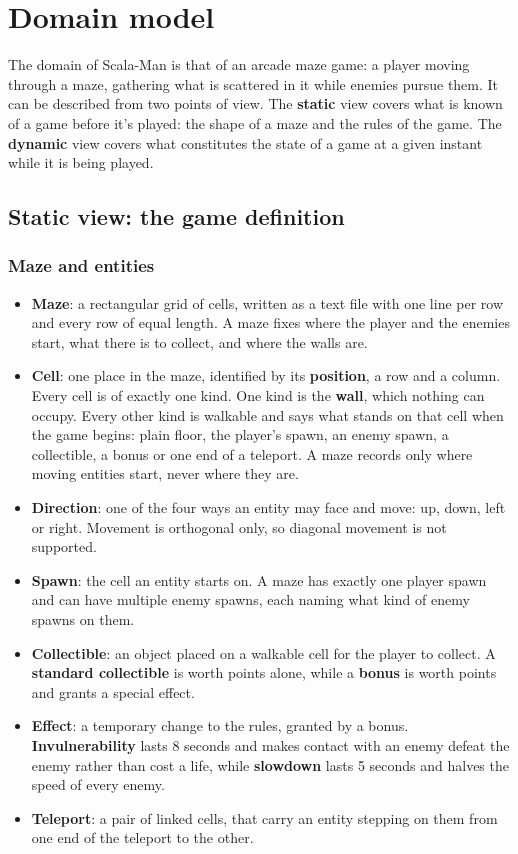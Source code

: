 \section{Domain model}

The domain of Scala-Man is that of an arcade maze game: a player moving through a maze, gathering what is scattered in
it while enemies pursue them. It can be described from two points of view.
The \textbf{static} view covers what is known of a game before it's played: the shape of a maze and the rules of the
game. The \textbf{dynamic} view covers what constitutes the state of a game at a given instant while it is being played.

\subsection{Static view: the game definition}

\subsubsection{Maze and entities}

\begin{itemize}
  \item \textbf{Maze}: a rectangular grid of cells, written as a text file with one line per row and every row
  of equal length. A maze fixes where the player and the enemies start, what there is to collect, and where the walls are.
  \item \textbf{Cell}: one place in the maze, identified by its \textbf{position}, a row and a column. Every cell is
  of exactly one kind. One kind is the \textbf{wall}, which nothing can occupy. Every other kind is walkable and says
  what stands on that cell when the game begins: plain floor, the player's spawn, an enemy spawn, a collectible, a
  bonus or one end of a teleport. A maze records only where moving entities start, never where they are.
  \item \textbf{Direction}: one of the four ways an entity may face and move: up, down, left or right. Movement
  is orthogonal only, so diagonal movement is not supported.
  \item \textbf{Spawn}: the cell an entity starts on. A maze has exactly one player spawn and can have multiple enemy
  spawns, each naming what kind of enemy spawns on them.
  \item \textbf{Collectible}: an object placed on a walkable cell for the player to collect. A \textbf{standard
  collectible} is worth points alone, while a \textbf{bonus} is worth points and grants a special effect.
  \item \textbf{Effect}: a temporary change to the rules, granted by a bonus. \textbf{Invulnerability} lasts 8
  seconds and makes contact with an enemy defeat the enemy rather than cost a life, while \textbf{slowdown}
  lasts 5 seconds and halves the speed of every enemy.
  \item \textbf{Teleport}: a pair of linked cells, that carry an entity stepping on them from one end of the teleport
  to the other.
\end{itemize}

